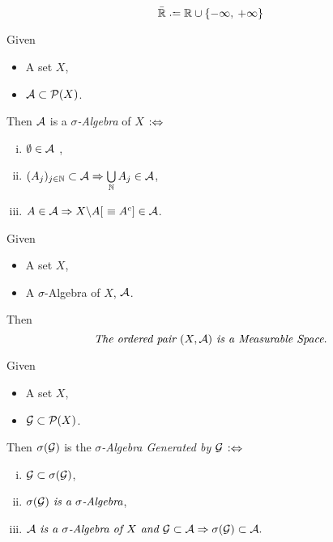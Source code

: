 
\begin{definition}
$$\eR \defeq \R \cup \{-\infty,\> +\infty\}$$
\end{definition}

\begin{definition}
Given
\begin{itemize}
\item
	A set $X$,
\item
	$\mathcal{A} \subset \mathcal{P}(X)$.
\end{itemize}
Then $\mathcal{A}$ is a \emph{$\sigma$-Algebra} of $X$ $\mathrel{\vcentcolon\Leftrightarrow}$
\begin{enumerate}[(i)]
\centering
\item
	$\emptyset \in \mathcal{A}$ \vspace{2pt},
\item
	$(A_j)_{j\in\mathbb{N}} \subset \mathcal{A} \Rightarrow \bigcup\limits_{\mathbb{N}} A_j \in \mathcal{A}$,
\item
	$A \in \mathcal{A} \Rightarrow  X\backslash{}A [\ \equiv A^c] \in \mathcal{A}$.
\end{enumerate}
\end{definition}

\begin{definition}
Given
\begin{itemize}
\item
	A set $X$,
\item
	A $\sigma$-Algebra of $X$, $\mathcal{A}$.
\end{itemize}
Then
$$\text{\it The ordered pair }(X, \mathcal{A}) \text{\it \ is a } \emph{Measurable Space}.$$
\end{definition}

\begin{definition}
Given 
\begin{itemize}
\item
	A set $X$,
\item
	$\mathcal{G} \subset \mathcal{P}(X)$.
\end{itemize}
Then $\sigma(\mathcal{G})$ is the \emph{$\sigma$-Algebra Generated by $\mathcal{G}$} $\mathrel{\vcentcolon\Leftrightarrow}$
\begin{enumerate}[(i)]
\centering
\item
	$\mathcal{G} \subset \sigma(\mathcal{G})$,
\item
	$\sigma(\mathcal{G}) \text{\it\ is a } \sigma\text{\it -Algebra}$,
\item
	$\mathcal{A} \text{\it\ is a }\sigma\text{\it-Algebra of } X \text{\it\ and } \mathcal{G} \subset \mathcal{A}  \Rightarrow \sigma(\mathcal{G}) \subset \mathcal{A}.$
\end{enumerate}
\end{definition}

